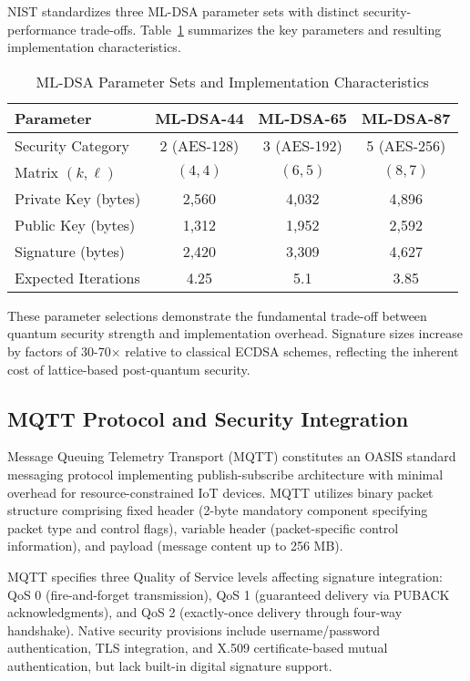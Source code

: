 \documentclass[journal=tches,final]{iacrtrans}
\begin{document}
NIST standardizes three ML-DSA parameter sets with distinct security-performance trade-offs. Table~\ref{tab:mldsa-params} summarizes the key parameters and resulting implementation characteristics.

\begin{table}[h]
  \centering
  \caption{ML-DSA Parameter Sets and Implementation Characteristics}
  \label{tab:mldsa-params}
  \begin{tabular}{lccc}
    \hline
    \textbf{Parameter} & \textbf{ML-DSA-44} & \textbf{ML-DSA-65} & \textbf{ML-DSA-87} \\
    \hline
    Security Category & 2 (AES-128) & 3 (AES-192) & 5 (AES-256) \\
    Matrix $(k,\ell)$ & $(4,4)$ & $(6,5)$ & $(8,7)$ \\
    Private Key (bytes) & 2,560 & 4,032 & 4,896 \\
    Public Key (bytes) & 1,312 & 1,952 & 2,592 \\
    Signature (bytes) & 2,420 & 3,309 & 4,627 \\
    Expected Iterations & 4.25 & 5.1 & 3.85 \\
    \hline
  \end{tabular}
\end{table}

These parameter selections demonstrate the fundamental trade-off between quantum security strength and implementation overhead. Signature sizes increase by factors of 30-70× relative to classical ECDSA schemes, reflecting the inherent cost of lattice-based post-quantum security.

{\color{blue}\subsection{MQTT Protocol and Security Integration}

Message Queuing Telemetry Transport (MQTT) constitutes an OASIS standard messaging protocol implementing publish-subscribe architecture with minimal overhead for resource-constrained IoT devices. MQTT utilizes binary packet structure comprising fixed header (2-byte mandatory component specifying packet type and control flags), variable header (packet-specific control information), and payload (message content up to 256 MB).

MQTT specifies three Quality of Service levels affecting signature integration: QoS 0 (fire-and-forget transmission), QoS 1 (guaranteed delivery via PUBACK acknowledgments), and QoS 2 (exactly-once delivery through four-way handshake). Native security provisions include username/password authentication, TLS integration, and X.509 certificate-based mutual authentication, but lack built-in digital signature support.}
\end{document}
